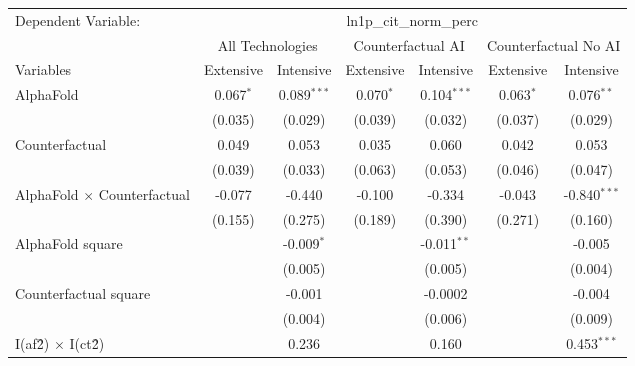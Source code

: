 \begingroup
\centering
\begin{tabular}{lcccccc}
   \tabularnewline \midrule \midrule
   Dependent Variable: & \multicolumn{6}{c}{ln1p\_cit\_norm\_perc}\\
 & \multicolumn{2}{c}{All Technologies} & \multicolumn{2}{c}{Counterfactual AI} & \multicolumn{2}{c}{Counterfactual No AI} \\
\cmidrule(lr){1-1}\cmidrule(lr){2-3} \cmidrule(lr){4-5} \cmidrule(lr){6-7}
Variables & \multicolumn{1}{c}{Extensive} & \multicolumn{1}{c}{Intensive} & \multicolumn{1}{c}{Extensive} & \multicolumn{1}{c}{Intensive} & \multicolumn{1}{c}{Extensive} & \multicolumn{1}{c}{Intensive} \\
\cmidrule(lr){1-1}\cmidrule(lr){2-2} \cmidrule(lr){3-3} \cmidrule(lr){4-4} \cmidrule(lr){5-5} \cmidrule(lr){6-6} \cmidrule(lr){7-7}
   AlphaFold                          & 0.067$^{*}$ & 0.089$^{***}$ & 0.070$^{*}$ & 0.104$^{***}$ & 0.063$^{*}$ & 0.076$^{**}$\\   
                                      & (0.035)     & (0.029)       & (0.039)     & (0.032)       & (0.037)     & (0.029)\\   
   Counterfactual                     & 0.049       & 0.053         & 0.035       & 0.060         & 0.042       & 0.053\\   
                                      & (0.039)     & (0.033)       & (0.063)     & (0.053)       & (0.046)     & (0.047)\\   
   AlphaFold $\times$ Counterfactual  & -0.077      & -0.440        & -0.100      & -0.334        & -0.043      & -0.840$^{***}$\\   
                                      & (0.155)     & (0.275)       & (0.189)     & (0.390)       & (0.271)     & (0.160)\\   
   AlphaFold square                   &             & -0.009$^{*}$  &             & -0.011$^{**}$ &             & -0.005\\   
                                      &             & (0.005)       &             & (0.005)       &             & (0.004)\\   
   Counterfactual square              &             & -0.001        &             & -0.0002       &             & -0.004\\   
                                      &             & (0.004)       &             & (0.006)       &             & (0.009)\\   
   I(af\^2) $\times$ I(ct\^2)         &             & 0.236         &             & 0.160         &             & 0.453$^{***}$\\   

\end{tabular}
